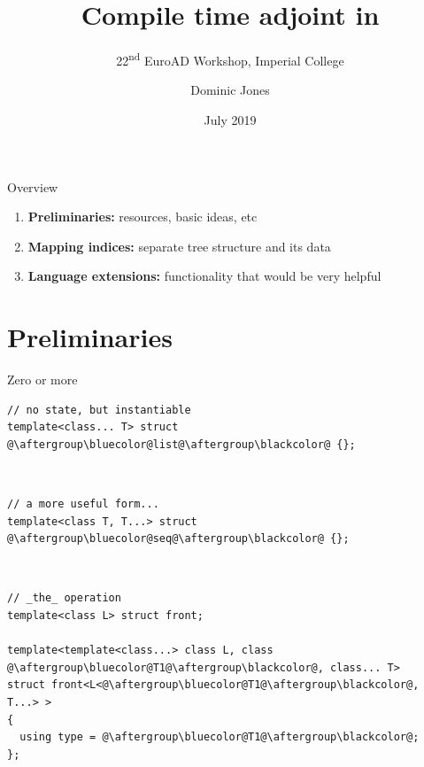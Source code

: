 \documentclass[xcolor=dvipsnames]{beamer}
\title{Compile time adjoint in \CC}
\subtitle{22\textsuperscript{nd} EuroAD Workshop, Imperial College}
\author{Dominic Jones}
\date{\small{July 2019}}
\institute{\small{\texttt{github.com/DominicJones}}}
\begin{document}
\begin{frame}[plain]
  \titlepage
\end{frame}


\begin{frame}[fragile]{Overview}
  \begin{enumerate}
  \item {\bf Preliminaries:} resources, basic ideas, etc \vspace{5mm}
  \item {\bf Mapping indices:} separate tree structure and its data \vspace{5mm}
  \item {\bf Language extensions:} functionality that would be very helpful \vspace{5mm}
  \end{enumerate}
\end{frame}


\section{Preliminaries}

\begin{frame}[fragile]{Zero or more}
\begin{lstlisting}
// no state, but instantiable
template<class... T> struct @\aftergroup\bluecolor@list@\aftergroup\blackcolor@ {};
\end{lstlisting}

~

\begin{lstlisting}
// a more useful form...
template<class T, T...> struct @\aftergroup\bluecolor@seq@\aftergroup\blackcolor@ {};
\end{lstlisting}

~

\begin{lstlisting}
// _the_ operation
template<class L> struct front;

template<template<class...> class L, class @\aftergroup\bluecolor@T1@\aftergroup\blackcolor@, class... T>
struct front<L<@\aftergroup\bluecolor@T1@\aftergroup\blackcolor@, T...> >
{
  using type = @\aftergroup\bluecolor@T1@\aftergroup\blackcolor@;
};
\end{lstlisting}
\end{frame}
\end{document}
